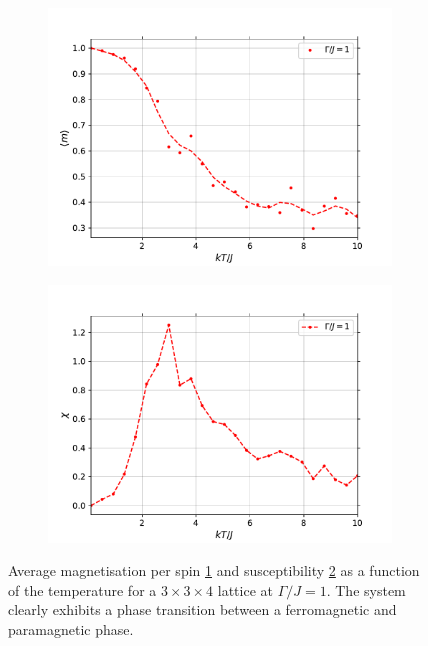 \documentclass[11pt,openany]{article}
\begin{document}
\begin{figure}[H]
	\centering
	\begin{subfigure}{0.45\textwidth}
		\centering
		\caption{}
		\label{fig:T_m}
		\includegraphics[width=\textwidth]{Plots/T_transition_m.pdf}
	\end{subfigure}
	\begin{subfigure}{0.45\textwidth}
		\centering
		\caption{}
		\label{fig:T_chi}
		\includegraphics[width=\textwidth]{Plots/T_transition_chi.pdf}
	\end{subfigure}
	\caption{Average magnetisation per spin \ref{fig:T_m} and susceptibility \ref{fig:T_chi} as a function of the temperature for a $3\times3\times4$ lattice at $\Gamma/J=1$. The system clearly exhibits a phase transition between a ferromagnetic and paramagnetic phase.}
	\label{fig:T_transition}
\end{figure}
\end{document}
